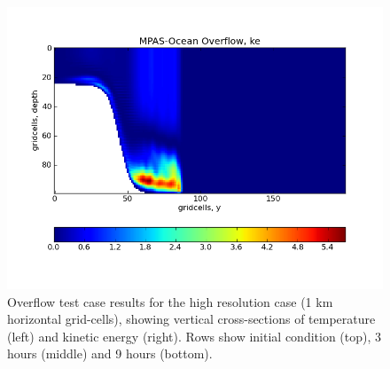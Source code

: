 \begin{figure}[H!]
	\includegraphics[scale=0.4]{ocean/figures/MPAS-O_overflow_ke_9hrs.png}
	\caption{Overflow test case results for the high resolution case (1 km horizontal grid-cells), showing vertical cross-sections of temperature (left) and kinetic energy (right).  Rows show initial condition (top), 3 hours (middle) and 9 hours (bottom).}
	\label{fig:overflow}
\end{figure}
